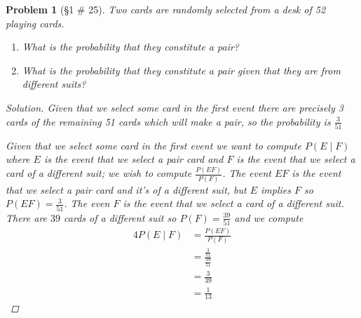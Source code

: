 \documentclass[11pt, oneside]{book}   	%
\newtheorem{problem}{Problem}
\begin{document}
\begin{problem}[\S 1 \# 25]
	Two cards are randomly selected from a desk of 52 playing cards. 
	\begin{enumerate}
		\item What is the probability that they constitute a pair? 
		\item What is the probability that they constitute a pair given that they are from different suits? 
	\end{enumerate}
	\begin{proof}[Solution]
		Given that we select some card in the first event there are precisely 3 cards of the remaining 51 cards which will make a pair, so the probability is $\frac{3}{51}$
		
		Given that we select some card in the first event we want to compute $P(E\mid F)$ where $E$ is the event that we select a pair card and $F$ is the event that we select a card of a different suit; we wish to compute $\frac{P(EF)}{P(F)}$. The event $EF$ is the event that we select a pair card and it's of a different suit, but $E$ implies $F$ so $P(EF)=\frac{3}{51}$. The even $F$ is the event that we select a card of a different suit. There are $39$ cards of a different suit so $P(F)=\frac{39}{51}$ and we compute
		\begin{alignat*}{4}
			P(E\mid F)&=\frac{P(EF)}{P(F)} \\
				&=\frac{\frac{3}{51}}{\frac{39}{51}} \\
				&=\frac{3}{39} \\
				&=\frac{1}{13}
		\end{alignat*}
	\end{proof}
\end{problem}
\end{document}
